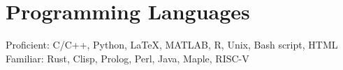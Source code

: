 \section{\sc Programming Languages}
Proficient: C/C++, Python, \LaTeX, MATLAB, R, Unix, Bash script, HTML\\
Familiar: Rust, Clisp, Prolog, Perl, Java, Maple, RISC-V\\
\endinput
